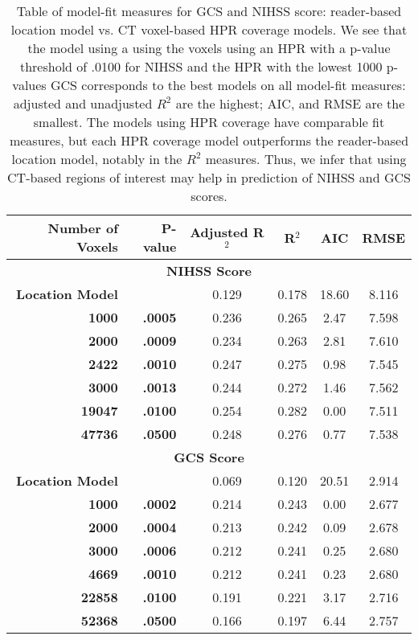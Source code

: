 \begin{table}[H]
\centering
\begin{tabular}{rr|cccc}
  \hline
{\bf Number of Voxels} & {\bf P-value} & {\bf Adjusted R$^2$} & {\bf R$^2$} & {\bf AIC} & {\bf RMSE} \\ 
  \hline \multicolumn{6}{c}{\bf NIHSS Score }\\ 
 \hline
\bf Location Model & \bf  & 0.129 & 0.178 & 18.60 & 8.116 \\ 
  \bf 1000 & \bf .0005 & 0.236 & 0.265 & 2.47 & 7.598 \\ 
  \bf 2000 & \bf .0009 & 0.234 & 0.263 & 2.81 & 7.610 \\ 
  \bf 2422 & \bf .0010 & 0.247 & 0.275 & 0.98 & 7.545 \\ 
  \bf 3000 & \bf .0013 & 0.244 & 0.272 & 1.46 & 7.562 \\ 
  \bf 19047 & \bf .0100 & 0.254 & 0.282 & 0.00 & 7.511 \\ 
  \bf 47736 & \bf .0500 & 0.248 & 0.276 & 0.77 & 7.538 \\ 
    \hline\hline \multicolumn{6}{c}{\bf GCS Score }\\ 
\hline \bf Location Model & \bf  & 0.069 & 0.120 & 20.51 & 2.914 \\ 
  \bf 1000 & \bf .0002 & 0.214 & 0.243 & 0.00 & 2.677 \\ 
  \bf 2000 & \bf .0004 & 0.213 & 0.242 & 0.09 & 2.678 \\ 
  \bf 3000 & \bf .0006 & 0.212 & 0.241 & 0.25 & 2.680 \\ 
  \bf 4669 & \bf .0010 & 0.212 & 0.241 & 0.23 & 2.680 \\ 
  \bf 22858 & \bf .0100 & 0.191 & 0.221 & 3.17 & 2.716 \\ 
  \bf 52368 & \bf .0500 & 0.166 & 0.197 & 6.44 & 2.757 \\ 
   \hline
\end{tabular}
\caption{Table of model-fit measures for GCS and NIHSS score: reader-based location model vs. CT voxel-based HPR coverage models. We see that the model using a using the voxels using an HPR with a p-value threshold of .0100 for NIHSS and the HPR with the lowest 1000 p-values GCS corresponds to the best models on all model-fit measures: adjusted and unadjusted $R^2$ are the highest; AIC, and RMSE are the smallest.  The models using HPR coverage have comparable fit measures, but each HPR coverage model outperforms the reader-based location model, notably in the $R^2$ measures.  Thus, we infer that using CT-based regions of interest may help in prediction of NIHSS and GCS scores.} 
\label{t:allres}
\end{table}
